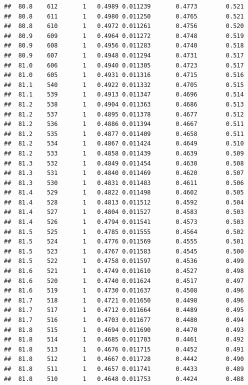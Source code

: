 \documentclass[
]{book}
\begin{document}
\begin{verbatim}
##  80.8    612       1   0.4989 0.011239       0.4773        0.521
##  80.8    611       1   0.4980 0.011250       0.4765        0.521
##  80.8    610       1   0.4972 0.011261       0.4756        0.520
##  80.9    609       1   0.4964 0.011272       0.4748        0.519
##  80.9    608       1   0.4956 0.011283       0.4740        0.518
##  80.9    607       1   0.4948 0.011294       0.4731        0.517
##  81.0    606       1   0.4940 0.011305       0.4723        0.517
##  81.0    605       1   0.4931 0.011316       0.4715        0.516
##  81.1    540       1   0.4922 0.011332       0.4705        0.515
##  81.1    539       1   0.4913 0.011347       0.4696        0.514
##  81.2    538       1   0.4904 0.011363       0.4686        0.513
##  81.2    537       1   0.4895 0.011378       0.4677        0.512
##  81.2    536       1   0.4886 0.011394       0.4667        0.511
##  81.2    535       1   0.4877 0.011409       0.4658        0.511
##  81.2    534       1   0.4867 0.011424       0.4649        0.510
##  81.2    533       1   0.4858 0.011439       0.4639        0.509
##  81.3    532       1   0.4849 0.011454       0.4630        0.508
##  81.3    531       1   0.4840 0.011469       0.4620        0.507
##  81.3    530       1   0.4831 0.011483       0.4611        0.506
##  81.4    529       1   0.4822 0.011498       0.4602        0.505
##  81.4    528       1   0.4813 0.011512       0.4592        0.504
##  81.4    527       1   0.4804 0.011527       0.4583        0.503
##  81.4    526       1   0.4794 0.011541       0.4573        0.503
##  81.5    525       1   0.4785 0.011555       0.4564        0.502
##  81.5    524       1   0.4776 0.011569       0.4555        0.501
##  81.5    523       1   0.4767 0.011583       0.4545        0.500
##  81.5    522       1   0.4758 0.011597       0.4536        0.499
##  81.6    521       1   0.4749 0.011610       0.4527        0.498
##  81.6    520       1   0.4740 0.011624       0.4517        0.497
##  81.6    519       1   0.4730 0.011637       0.4508        0.496
##  81.7    518       1   0.4721 0.011650       0.4498        0.496
##  81.7    517       1   0.4712 0.011664       0.4489        0.495
##  81.7    516       1   0.4703 0.011677       0.4480        0.494
##  81.8    515       1   0.4694 0.011690       0.4470        0.493
##  81.8    514       1   0.4685 0.011703       0.4461        0.492
##  81.8    513       1   0.4676 0.011715       0.4452        0.491
##  81.8    512       1   0.4667 0.011728       0.4442        0.490
##  81.8    511       1   0.4657 0.011741       0.4433        0.489
##  81.8    510       1   0.4648 0.011753       0.4424        0.488

\end{verbatim}
\end{document}
